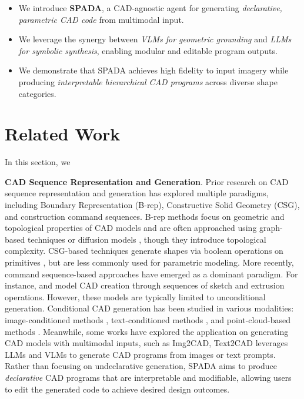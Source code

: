 \documentclass[doubleblind]{ecai}
\begin{document}
\begin{itemize}
  \item We introduce \textbf{SPADA}, a CAD-agnostic agent for generating \emph{declarative, parametric CAD code} from multimodal input.
  \item We leverage the synergy between \emph{VLMs for geometric grounding} and \emph{LLMs for symbolic synthesis}, enabling modular and editable program outputs.
  \item We demonstrate that SPADA achieves high fidelity to input imagery while producing \emph{interpretable hierarchical CAD programs} across diverse shape categories.
\end{itemize}


\section{Related Work}

In this section, we

\textbf{CAD Sequence Representation and Generation}. Prior research on CAD sequence representation and generation has explored multiple paradigms, including Boundary Representation (B-rep), Constructive Solid Geometry (CSG), and construction command sequences. B-rep methods focus on geometric and topological properties of CAD models and are often approached using graph-based techniques or diffusion models \citep{koch2019abc,guo2022complexgen}, though they introduce topological complexity. CSG-based techniques generate shapes via boolean operations on primitives \citep{ren2021csg}, but are less commonly used for parametric modeling. More recently, command sequence-based approaches have emerged as a dominant paradigm. For instance, \citet{wu2021deepcad} and \citet{willis2021fusion360} model CAD creation through sequences of sketch and extrusion operations. However, these models are typically limited to unconditional generation. Conditional CAD generation has been studied in various modalities: image-conditioned methods \citep{you2024img2cad,yuan2024openecad}, text-conditioned methods \citep{khan2024text2cad,badagabettu2024query2cad}, and point-cloud-based methods \citep{uy2022point2cyl,dupont2024transcad}. Meanwhile, some works have explored the application on generating CAD models with multimodal inputs, such as Img2CAD, Text2CAD leverages LLMs and VLMs to generate CAD programs from images or text prompts. Rather than focusing on undeclarative generation, SPADA aims to produce \emph{declarative} CAD programs that are interpretable and modifiable, allowing users to edit the generated code to achieve desired design outcomes.
\end{document}
